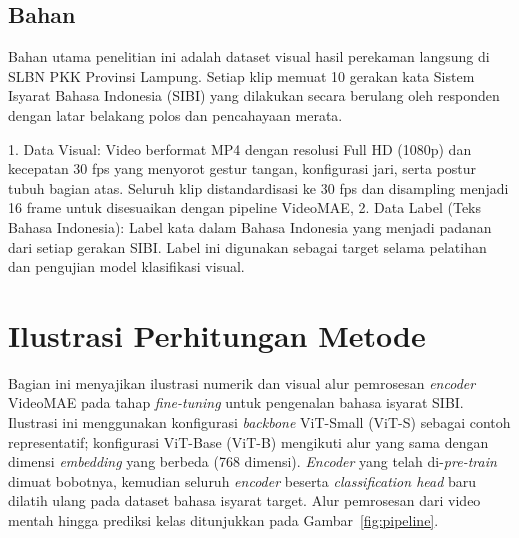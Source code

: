 \subsection{Bahan} \label{III.Bahan}
Bahan utama penelitian ini adalah dataset visual hasil perekaman langsung di SLBN PKK Provinsi Lampung. Setiap klip memuat 10 gerakan kata Sistem Isyarat Bahasa Indonesia (SIBI) yang dilakukan secara berulang oleh responden dengan latar belakang polos dan pencahayaan merata.\par
1. Data Visual: Video berformat MP4 dengan resolusi Full HD (1080p) dan kecepatan 30 fps yang menyorot gestur tangan, konfigurasi jari, serta postur tubuh bagian atas. Seluruh klip distandardisasi ke 30 fps dan disampling menjadi 16 frame untuk disesuaikan dengan pipeline VideoMAE, 2. Data Label (Teks Bahasa Indonesia): Label kata dalam Bahasa Indonesia yang menjadi padanan dari setiap gerakan SIBI. Label ini digunakan sebagai target selama pelatihan dan pengujian model klasifikasi visual. \par




\section{Ilustrasi Perhitungan Metode} \label{III.Ilustrasi}
 
Bagian ini menyajikan ilustrasi numerik dan visual alur pemrosesan \textit{encoder}
VideoMAE pada tahap \textit{fine-tuning} untuk pengenalan bahasa isyarat SIBI.
Ilustrasi ini menggunakan konfigurasi \textit{backbone} ViT-Small (ViT-S) sebagai contoh representatif; konfigurasi ViT-Base (ViT-B) mengikuti alur yang sama dengan dimensi \textit{embedding} yang berbeda (768 dimensi). \textit{Encoder} yang telah di-\textit{pre-train} dimuat bobotnya, kemudian seluruh \textit{encoder} beserta \textit{classification head} baru dilatih ulang pada dataset bahasa isyarat target.
Alur pemrosesan dari video mentah hingga prediksi kelas ditunjukkan pada Gambar~\ref{fig:pipeline}.

